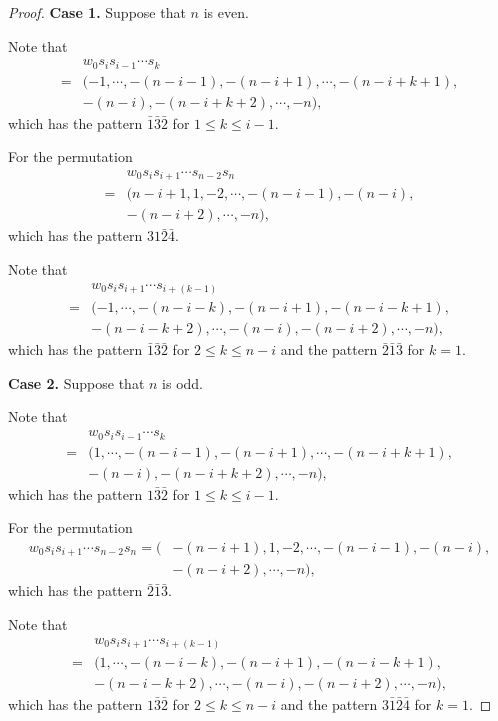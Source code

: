 \documentclass[10pt,a4paper]{amsart}
\begin{document}
\begin{proof}
{\bf Case 1.} Suppose that $n$ is even.

    Note that 
    \begin{align*}
        &w_0s_is_{i-1}\cdots s_k\\
        =&(-1,\cdots,-(n-i-1),-(n-i+1),\cdots,-(n-i+k+1),\\&-(n-i),-(n-i+k+2),\cdots,-n),
    \end{align*}
which has the pattern $\bar{1}\bar{3}\bar{2}$ for $1\leq k\leq i-1$.

For the permutation 
\begin{align*}
    &w_0s_is_{i+1}\cdots s_{n-2}s_n\\=&(n-i+1,1,-2,\cdots,-(n-i-1),-(n-i),\\&-(n-i+2),\cdots,-n),
\end{align*}
which has the pattern $31\bar{2}\bar{4}$.

 Note that 
    \begin{align*}
        &w_0s_is_{i+1}\cdots s_{i+(k-1)}\\
        =&(-1,\cdots,-(n-i-k),-(n-i+1),-(n-i-k+1),\\&-(n-i-k+2),\cdots,-(n-i),-(n-i+2),\cdots,-n),
    \end{align*}
which has the pattern $\bar{1}\bar{3}\bar{2}$ for $2\leq k\leq n-i$ and the pattern $\bar{2}\bar{1}\bar{3}$ for $k=1$.

{\bf Case 2.} Suppose that $n$ is odd.

  Note that 
    \begin{align*}
        &w_0s_is_{i-1}\cdots s_k\\
        =&(1,\cdots,-(n-i-1),-(n-i+1),\cdots,-(n-i+k+1),\\&-(n-i),-(n-i+k+2),\cdots,-n),
    \end{align*}
which has the pattern $1\bar{3}\bar{2}$ for $1\leq k\leq i-1$.   

For the permutation 
\begin{align*}
    w_0s_is_{i+1}\cdots s_{n-2}s_n=(&-(n-i+1),1,-2,\cdots,-(n-i-1),-(n-i),\\&-(n-i+2),\cdots,-n),
\end{align*}
 which has the pattern $\bar{2}\bar{1}\bar{3}$.

 Note that 
    \begin{align*}
        &w_0s_is_{i+1}\cdots s_{i+(k-1)}\\
        =&(1,\cdots,-(n-i-k),-(n-i+1),-(n-i-k+1),\\&-(n-i-k+2),\cdots,-(n-i),-(n-i+2),\cdots,-n),
    \end{align*}
which has the pattern $1\bar{3}\bar{2}$ for $2\leq k\leq n-i$ and the pattern $3\bar{1}\bar{2}\bar{4}$ for $k=1$.

\end{proof}
\end{document}
